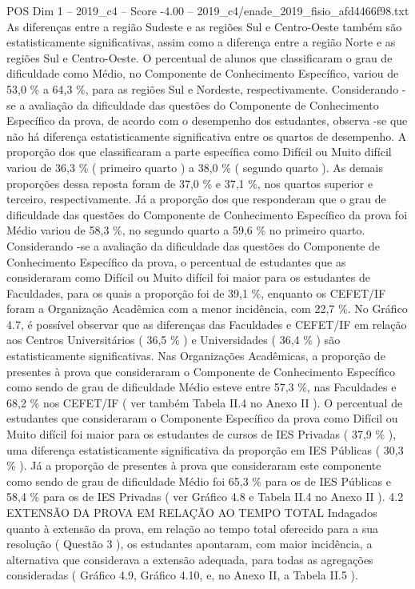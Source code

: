 \begin{textsample}{POS Dim 1 – 2019\_c4 – Score -4.00 – 2019\_c4/enade\_2019\_fisio\_afd4466f98.txt}
As diferenças entre a região Sudeste e as regiões Sul e Centro-Oeste também são estatisticamente significativas, assim como a diferença entre a região Norte e as regiões Sul e Centro-Oeste.
O percentual de alunos que classificaram o grau de dificuldade como Médio, no Componente de Conhecimento Específico, variou de 53,0 \% a 64,3 \%, para as regiões Sul e Nordeste, respectivamente.
Considerando -se a avaliação da dificuldade das questões do Componente de Conhecimento Específico da prova, de acordo com o desempenho dos estudantes, observa -se que não há diferença estatisticamente significativa entre os quartos de desempenho.
A proporção dos que classificaram a parte específica como Difícil ou Muito difícil variou de 36,3 \% ( primeiro quarto ) a 38,0 \% ( segundo quarto ).
As demais proporções dessa reposta foram de 37,0 \% e 37,1 \%, nos quartos superior e terceiro, respectivamente.
Já a proporção dos que responderam que o grau de dificuldade das questões do Componente de Conhecimento Específico da prova foi Médio variou de 58,3 \%, no segundo quarto a 59,6 \% no primeiro quarto.
Considerando -se a avaliação da dificuldade das questões do Componente de Conhecimento Específico da prova, o percentual de estudantes que as consideraram como Difícil ou Muito difícil foi maior para os estudantes de Faculdades, para os quais a proporção foi de 39,1 \%, enquanto os CEFET/IF foram a Organização Acadêmica com a menor incidência, com 22,7 \%.
No Gráfico 4.7, é possível observar que as diferenças das Faculdades e CEFET/IF em relação aos Centros Universitários ( 36,5 \% ) e Universidades ( 36,4 \% ) são estatisticamente significativas.
Nas Organizações Acadêmicas, a proporção de presentes à prova que consideraram o Componente de Conhecimento Específico como sendo de grau de dificuldade Médio esteve entre 57,3 \%, nas Faculdades e 68,2 \% nos CEFET/IF ( ver também Tabela II.4 no Anexo II ).
O percentual de estudantes que consideraram o Componente Específico da prova como Difícil ou Muito difícil foi maior para os estudantes de cursos de IES Privadas ( 37,9 \% ), uma diferença estatisticamente significativa da proporção em IES Públicas ( 30,3 \% ).
Já a proporção de presentes à prova que consideraram este componente como sendo de grau de dificuldade Médio foi 65,3 \% para os de IES Públicas e 58,4 \% para os de IES Privadas ( ver Gráfico 4.8 e Tabela II.4 no Anexo II ). 4.2 EXTENSÃO DA PROVA EM RELAÇÃO AO TEMPO TOTAL Indagados quanto à extensão da prova, em relação ao tempo total oferecido para a sua resolução ( Questão 3 ), os estudantes apontaram, com maior incidência, a alternativa que considerava a extensão adequada, para todas as agregações consideradas ( Gráfico 4.9, Gráfico 4.10, e, no Anexo II, a Tabela II.5 ).

\end{textsample}
